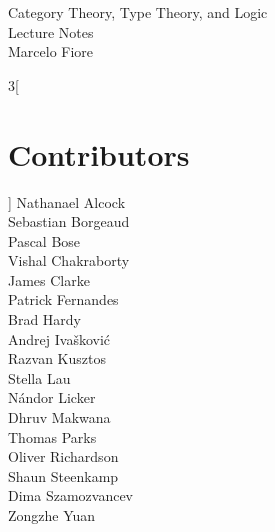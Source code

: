 \newcommand{\phold}{\text{--}}
\newcommand{\Phold}{\text{=}}

\newcommand{\op}{\mathrm{op}}

\newcommand{\Efrac}[2]{%
  \mathchoice
    {\ooalign{%
      $\genfrac{}{}{2.0pt}0{#1}{#2}$\cr%
      $\color{white}\genfrac{}{}{1.0pt}0{\phantom{#1}}{\phantom{#2}}$}}%
    {\ooalign{%
      $\genfrac{}{}{2.0pt}1{#1}{#2}$\cr%
      $\color{white}\genfrac{}{}{1.0pt}1{\phantom{#1}}{\phantom{#2}}$}}%
    {\ooalign{%
      $\genfrac{}{}{2.0pt}2{#1}{#2}$\cr%
      $\color{white}\genfrac{}{}{1.0pt}2{\phantom{#1}}{\phantom{#2}}$}}%
    {\ooalign{%
      $\genfrac{}{}{2.0pt}3{#1}{#2}$\cr%
      $\color{white}\genfrac{}{}{1.0pt}3{\phantom{#1}}{\phantom{#2}}$}}%
}

\newcommand{\efrac}[2]{%
  \mathchoice
    {\ooalign{%
      $\genfrac{}{}{2.0pt}0{\hphantom{#1}}{\hphantom{#2}}$\cr%
      $\color{white}\genfrac{}{}{1.0pt}0{\color{black}#1}{\color{black}#2}$}}%
    {\ooalign{%
      $\genfrac{}{}{2.0pt}1{\hphantom{#1}}{\hphantom{#2}}$\cr%
      $\color{white}\genfrac{}{}{1.0pt}1{\color{black}#1}{\color{black}#2}$}}%
    {\ooalign{%
      $\genfrac{}{}{2.0pt}2{\hphantom{#1}}{\hphantom{#2}}$\cr%
      $\color{white}\genfrac{}{}{1.0pt}2{\color{black}#1}{\color{black}#2}$}}%
    {\ooalign{%
      $\genfrac{}{}{2.0pt}3{\hphantom{#1}}{\hphantom{#2}}$\cr%
      $\color{white}\genfrac{}{}{1.0pt}3{\color{black}#1}{\color{black}#2}$}}%
}



\begin{center} {\LARGE \sc
Category Theory, Type Theory, and Logic\\
  Lecture Notes\\[4mm]}
  \Large Marcelo Fiore
\end{center}


\thispagestyle{plain}
\begin{multicols}{3}[\section*{Contributors}]
Nathanael Alcock\\
Sebastian Borgeaud\\
Pascal Bose\\
Vishal Chakraborty\\
James Clarke\\
Patrick Fernandes\\
Brad Hardy\\
Andrej Ivašković\\
Razvan Kusztos\\
Stella Lau\\
Nándor Licker\\
Dhruv Makwana\\
Thomas Parks\\
Oliver Richardson\\
Shaun Steenkamp\\
Dima Szamozvancev\\
Zongzhe Yuan\\
\end{multicols}
\clearpage


